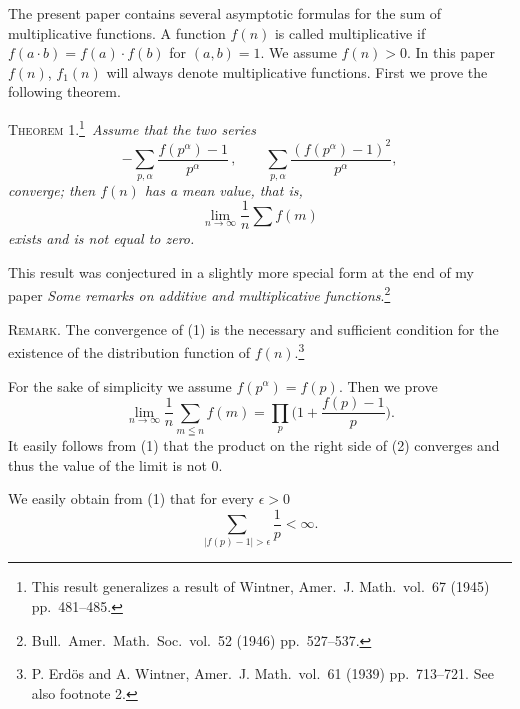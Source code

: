 \documentclass[11pt]{article}
\begin{document}
\setcounter{page}{536}

The present paper contains several asymptotic formulas for the sum of
multiplicative functions. A function $f(n)$ is called multiplicative if
$f(a\cdot b)=f(a)\cdot f(b)$ for $(a,b)=1$. We assume $f(n)>0$. In this paper
$f(n)$, $f_1(n)$ will always denote multiplicative functions. First we prove
the following theorem.

\par\smallskip\begingroup\textsc{Theorem 1.}\footnote{This result generalizes
a result of Wintner, Amer.\ J. Math.\ vol.~67 (1945) pp.~481--485.}\
\itshape Assume that the two series
\begin{equation}\tag{1}
-\sum_{p,\alpha}\frac{f(p^\alpha)-1}{p^\alpha}\,,\qquad
\sum_{p,\alpha}\frac{(f(p^\alpha)-1)^2}{p^\alpha},
\end{equation}
converge; then $f(n)$ has a mean value, that is,
\begin{equation*}
\lim_{n\to\infty}\frac{1}{n}\textstyle\sum f(m)
\end{equation*}
exists and is not equal to zero.\thmend

This result was conjectured in a slightly more special form at the end of my
paper \emph{Some remarks on additive and multiplicative
functions}.\footnote{Bull.\ Amer.\ Math.\ Soc.\ vol.~52 (1946) pp.~527--537.}

\textsc{Remark.} The convergence of (1) is the necessary and sufficient
condition for the existence of the distribution function of
$f(n)$.\footnote{P. Erd\"os and A. Wintner, Amer.\ J. Math.\ vol.~61 (1939)
pp.~713--721. See also footnote 2.}

For the sake of simplicity we assume $f(p^\alpha)=f(p)$. Then we prove
\begin{equation}\tag{2}
\lim_{n\to\infty}\frac{1}{n}\sum_{m\leqq n}f(m)=\prod_p\biggl(1+\frac{f(p)-1}{p}\biggr).
\end{equation}
It easily follows from (1) that the product on the right side of (2) converges
and thus the value of the limit is not 0.

We easily obtain from (1) that for every $\epsilon>0$
\begin{equation*}
\sum_{|f(p)-1|>\epsilon}\frac{1}{p}<\infty.
\end{equation*}
\end{document}
